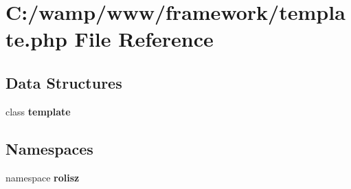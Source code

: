 \section{C:/wamp/www/framework/template.php File Reference}
\label{template_8php}
\subsection*{Data Structures}
\begin{DoxyCompactItemize}
\item 
class {\bf template}
\end{DoxyCompactItemize}
\subsection*{Namespaces}
\begin{DoxyCompactItemize}
\item 
namespace {\bf rolisz}
\end{DoxyCompactItemize}
